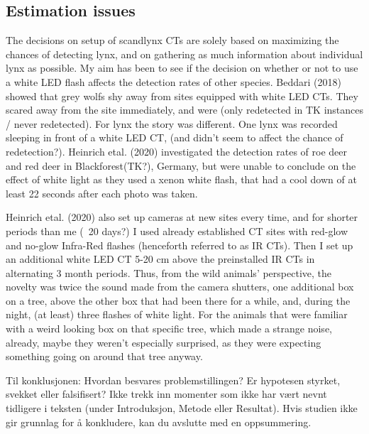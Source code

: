 \subsection{Estimation issues}

The decisions on setup of scandlynx CTs are solely based on maximizing the chances of detecting lynx, and on gathering as much information about individual lynx as possible.
My aim has been to see if the decision on whether or not to use a white LED flash affects the detection rates of other species. Beddari (2018) showed that grey wolfs shy away from sites equipped with white LED CTs. They scared away from the site immediately, and were (only redetected in TK instances / never redetected). For lynx the story was different. One lynx was recorded sleeping in front of a white LED CT, (and didn't seem to affect the chance of redetection?).
Heinrich etal. (2020) investigated the detection rates of roe deer and red deer in Blackforest(TK?), Germany, but were unable to conclude on the effect of white light as they used a xenon white flash, that had a cool down of at least 22 seconds after each photo was taken.

Heinrich etal. (2020) also set up cameras at new sites every time, and for shorter periods than me (~20 days?)%
I used already established CT sites with red-glow and no-glow Infra-Red flashes (henceforth referred to as IR CTs). Then I set up an additional white LED CT 5-20 cm above the preinstalled IR CTs in alternating 3 month periods.
Thus, from the wild animals' perspective, the novelty was twice the sound made from the camera shutters, one additional box on a tree, above the other box that had been there for a while, and, during the night, (at least) three flashes of white light.
For the animals that were familiar with a weird looking box on that specific tree, which made a strange noise, already, maybe they weren't especially surprised, as they were expecting something going on around that tree anyway.









Til konklusjonen:
Hvordan besvares problemstillingen? Er hypotesen styrket, svekket eller falsifisert? Ikke trekk inn momenter som ikke har vært nevnt tidligere i teksten (under Introduksjon, Metode eller Resultat). Hvis studien ikke gir grunnlag for å konkludere, kan du avslutte med en oppsummering.



